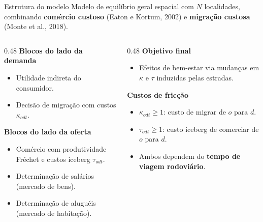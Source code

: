 \begin{frame}{Estrutura do modelo}
    Modelo de equilíbrio geral espacial com $N$ localidades, combinando
    \textbf{comércio custoso} (Eaton e Kortum, 2002) e \textbf{migração custosa} (Monte et al., 2018).

    \vspace{0.3cm}

    \begin{columns}[T]
        \begin{column}{0.48\textwidth}
            \textbf{Blocos do lado da demanda}
            \begin{itemize}
                \item Utilidade indireta do consumidor.
                \item Decisão de migração com custos $\kappa_{odt}$.
            \end{itemize}

            \vspace{0.25cm}

            \textbf{Blocos do lado da oferta}
            \begin{itemize}
                \item Comércio com produtividade Fréchet e custos iceberg $\tau_{odt}$.
                \item Determinação de salários (mercado de bens).
                \item Determinação de aluguéis (mercado de habitação).
            \end{itemize}
        \end{column}
        \begin{column}{0.48\textwidth}
            \textbf{Objetivo final}
            \begin{itemize}
                \item Efeitos de bem-estar via mudanças em $\kappa$ e $\tau$ induzidas pelas estradas.
            \end{itemize}

            \vspace{0.25cm}

            \textbf{Custos de fricção}
            \begin{itemize}
                \item $\kappa_{odt} \geq 1$: custo de migrar de $o$ para $d$.
                \item $\tau_{odt} \geq 1$: custo iceberg de comerciar de $o$ para $d$.
                \item Ambos dependem do \textbf{tempo de viagem rodoviário}.
            \end{itemize}
        \end{column}
    \end{columns}
\end{frame}

